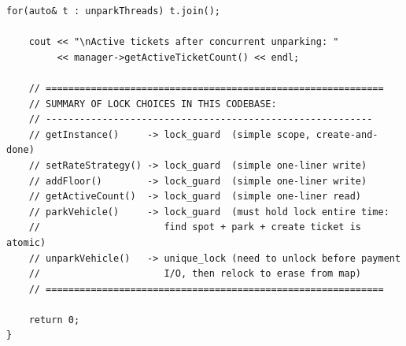 \documentclass[11pt,a4paper]{article}
\begin{document}
\begin{lstlisting}[title={\texttt{main.cpp}}]
    for(auto& t : unparkThreads) t.join();

    cout << "\nActive tickets after concurrent unparking: "
         << manager->getActiveTicketCount() << endl;

    // ============================================================
    // SUMMARY OF LOCK CHOICES IN THIS CODEBASE:
    // ----------------------------------------------------------
    // getInstance()     -> lock_guard  (simple scope, create-and-done)
    // setRateStrategy() -> lock_guard  (simple one-liner write)
    // addFloor()        -> lock_guard  (simple one-liner write)
    // getActiveCount()  -> lock_guard  (simple one-liner read)
    // parkVehicle()     -> lock_guard  (must hold lock entire time:
    //                      find spot + park + create ticket is atomic)
    // unparkVehicle()   -> unique_lock (need to unlock before payment
    //                      I/O, then relock to erase from map)
    // ============================================================

    return 0;
}
\end{lstlisting}
\end{document}
